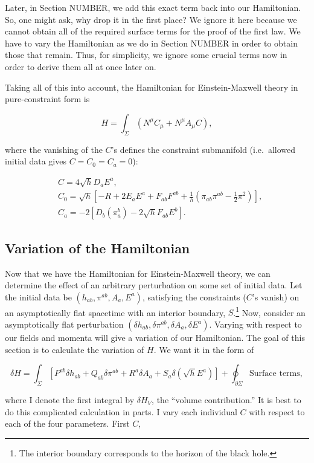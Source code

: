 \documentclass[titlepage]{article}
\def\beq{\begin{equation}}
\def\eeq{\end{equation}}
\begin{document}
\noindent
Later, in Section NUMBER, we add this exact term back into our Hamiltonian.  So, one might ask, why drop it in the first place?  We ignore it here because we cannot obtain all of the required surface terms for the proof of the first law. We have to vary the Hamiltonian as we do in Section NUMBER in order to obtain those that remain. Thus, for simplicity, we ignore some crucial terms now in order to derive them all at once later on.

Taking all of this into account, the Hamiltonian for Einstein-Maxwell theory in pure-constraint form is 

\beq
H = \int_\Sigma \left( N^\mu C_\mu + N^\mu A_\mu C \right),
\eeq

\noindent
where the vanishing of the $C$'s defines the constraint submanifold (i.e.\ allowed initial data gives $C=C_0=C_a=0$):

\beq
\begin{aligned}
&C    = 4 \sqrt{h} D_aE^a , \\
&C_0  =\sqrt{h} \left[-R + 2E_aE^a + F_{ab}F^{ab} + \frac{1}{h}\left( \pi_{ab}\pi^{ab} - \frac{1}{2}\pi^2 \right) \right] , \\
&C_a  =-2\left[ D_b\left(\pi^b_a \right)-2\sqrt{h} F_{ab}E^b \right].
\end{aligned}
\eeq


\subsection{Variation of the Hamiltonian}

Now that we have the Hamiltonian for Einstein-Maxwell theory, we can determine the effect of an arbitrary perturbation on some set of initial data. Let the initial data be $(h_{ab},\pi^{ab},A_a,E^a)$, satisfying the constraints ($C$'s vanish) on an asymptotically flat spacetime with an interior boundary, $S$.\footnote{The interior boundary corresponds to the horizon of the black hole.}  Now, consider an asymptotically flat perturbation $(\delta h_{ab},\delta\pi^{ab},\delta A_a,\delta E^a)$. Varying with respect to our fields and momenta will give a variation of our Hamiltonian.  The goal of this section is to calculate the variation of $H$.  We want it in the form of 

\beq
\delta H = \int_\Sigma \left[ P^{ab} \delta h_{ab} + Q_{ab}\delta \pi^{ab} +R^a\delta A_a + S_a\delta\left(\sqrt{h}E^a \right)    \right] + \oint_{\partial\Sigma}\text{Surface terms},
\eeq

\noindent
where I denote the first integral by $\delta H_V$, the ``volume contribution.''  It is best to do this complicated calculation in parts.  I vary each individual $C$ with respect to each of the four parameters.  First $C$,
\end{document}
